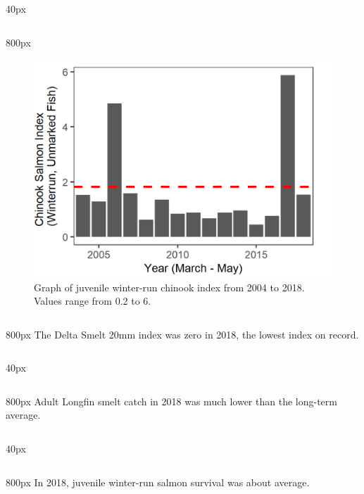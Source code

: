 \documentclass[
]{book}
\begin{document}
\begin{column}{40px\textwidth}
~
\end{column}

\begin{column}{800px\textwidth}
\begin{figure}
\includegraphics[width=15.25in]{figures/DJFMP_chinook_winterByLength_recyears} \caption{Graph of juvenile winter-run chinook index from 2004 to 2018. Values range from 0.2 to 6.}\label{fig:unnamed-chunk-45}
\end{figure}
\end{column}

\begin{column}{800px\textwidth}
The Delta Smelt 20mm index was zero in 2018, the lowest index on record.
\end{column}

\begin{column}{40px\textwidth}
~
\end{column}

\begin{column}{800px\textwidth}
Adult Longfin smelt catch in 2018 was much lower than the long-term average.
\end{column}

\begin{column}{40px\textwidth}
~
\end{column}

\begin{column}{800px\textwidth}
In 2018, juvenile winter-run salmon survival was about average.
\end{column}
\end{document}
